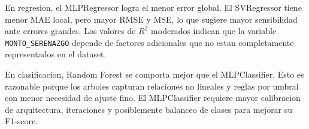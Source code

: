 En regresion, el MLPRegressor logra el menor error global. El SVRegressor tiene menor MAE local, pero mayor RMSE y MSE, lo que sugiere mayor sensibilidad ante errores grandes. Los valores de $R^2$ moderados indican que la variable \texttt{MONTO\_SERENAZGO} depende de factores adicionales que no estan completamente representados en el dataset.

En clasificacion, Random Forest se comporta mejor que el MLPClassifier. Esto es razonable porque los arboles capturan relaciones no lineales y reglas por umbral con menor necesidad de ajuste fino. El MLPClassifier requiere mayor calibracion de arquitectura, iteraciones y posiblemente balanceo de clases para mejorar su F1-score.
